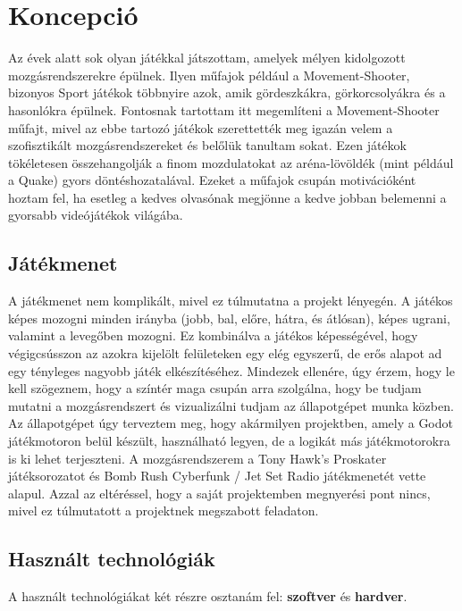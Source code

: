 \chapter{Koncepció}
\label{chap:Concept}

Az évek alatt sok olyan játékkal játszottam, amelyek mélyen kidolgozott mozgásrendszerekre épülnek. Ilyen műfajok például a Movement-Shooter, bizonyos Sport játékok többnyire azok, amik gördeszkákra, görkorcsolyákra és a hasonlókra épülnek. Fontosnak tartottam itt megemlíteni a Movement-Shooter műfajt, mivel az ebbe tartozó játékok szerettették meg igazán velem a szofisztikált mozgásrendszereket és belőlük tanultam sokat. Ezen játékok tökéletesen összehangolják a finom mozdulatokat az aréna-lövöldék (mint például a Quake) gyors döntéshozatalával. Ezeket a műfajok csupán motivációként hoztam fel, ha esetleg a kedves olvasónak megjönne a kedve jobban belemenni a gyorsabb videójátékok világába.

\section{Játékmenet}

A játékmenet nem komplikált, mivel ez túlmutatna a projekt lényegén. A játékos képes mozogni minden irányba (jobb, bal, előre, hátra, és átlósan), képes ugrani, valamint a levegőben mozogni. Ez kombinálva a játékos képességé\-vel, hogy végigcsússzon az azokra kijelölt felületeken egy elég egyszerű, de erős alapot ad egy tényleges nagyobb játék elkészítéséhez. Mindezek ellenére, úgy érzem, hogy le kell szögeznem, hogy a színtér maga csupán arra szolgálna, hogy be tudjam mutatni a mozgásrendszert és vizualizálni tudjam az állapotgé\-pet munka közben. Az állapotgépet úgy terveztem meg, hogy akármilyen projektben, amely a Godot játékmotoron belül készült, használható legyen, de a logikát más játékmotorokra is ki lehet terjeszteni. A mozgásrendszerem a Tony Hawk's Proskater játéksorozatot és Bomb Rush Cyberfunk / Jet Set Radio játékmenetét vette alapul. Azzal az eltéréssel, hogy a saját projektemben megnyerési pont nincs, mivel ez túlmutatott a projektnek megszabott feladaton.

\section{Használt technológiák}
\label{subsec:UsedTech}

A használt technológiákat két részre osztanám fel: \textbf{szoftver} és \textbf{hardver}. 

